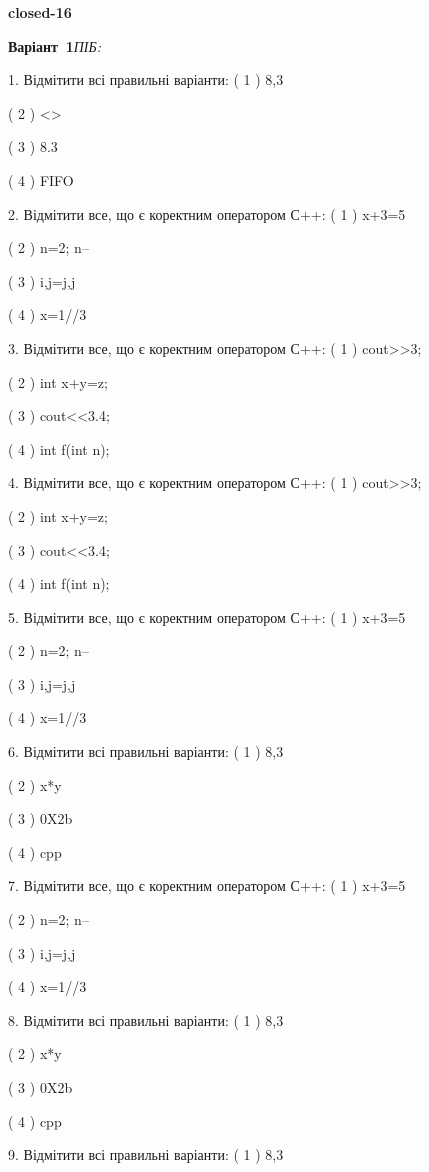 \documentclass[11pt]{article}
\begin{document}
{\large\textbf{closed-16}}

\textbf{Варіант \No\,1}\hfill \textit{ПІБ:}\,\underline{\hspace{60mm}}
\vspace{4mm}

1. Відмітити всі правильні варіанти:
( 1 ) 8,3

( 2 ) <>

( 3 ) 8.3

( 4 ) FIFO

2. Відмітити все, що є коректним оператором С++:
( 1 ) x+3=5

( 2 ) n=2; n--

( 3 ) i,j=j,j

( 4 ) x=1//3

3. Відмітити все, що є коректним оператором С++:
( 1 ) cout>>3;

( 2 ) int x+y=z;

( 3 ) cout<<3.4;

( 4 ) int f(int n);

4. Відмітити все, що є коректним оператором С++:
( 1 ) cout>>3;

( 2 ) int x+y=z;

( 3 ) cout<<3.4;

( 4 ) int f(int n);

5. Відмітити все, що є коректним оператором С++:
( 1 ) x+3=5

( 2 ) n=2; n--

( 3 ) i,j=j,j

( 4 ) x=1//3

6. Відмітити всі правильні варіанти:
( 1 ) 8,3

( 2 ) x*y

( 3 ) 0X2b

( 4 ) cpp

7. Відмітити все, що є коректним оператором С++:
( 1 ) x+3=5

( 2 ) n=2; n--

( 3 ) i,j=j,j

( 4 ) x=1//3

8. Відмітити всі правильні варіанти:
( 1 ) 8,3

( 2 ) x*y

( 3 ) 0X2b

( 4 ) cpp

9. Відмітити всі правильні варіанти:
( 1 ) 8,3
\end{document}
